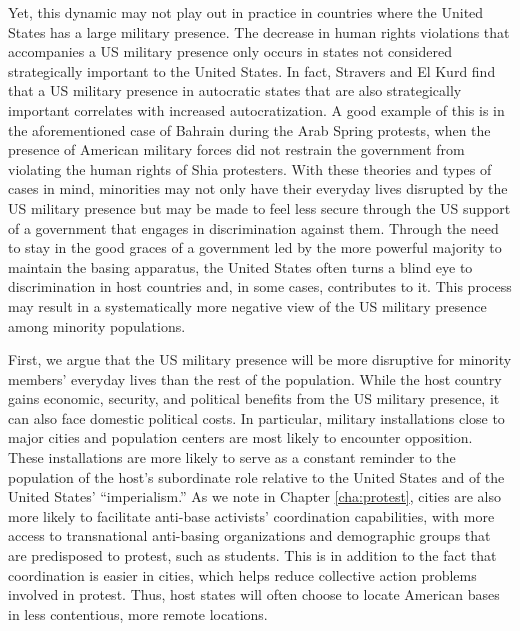 
Yet, this dynamic may not play out in practice in countries where the United States has a large military presence. The decrease in human rights violations that accompanies a US military presence only occurs in states not considered strategically important to the United States.\cite{bell2017} In fact, Stravers and El Kurd find that a US military presence in autocratic states that are also strategically important correlates with increased autocratization.\cite{StraversElKurd2018} A good example of this is in the aforementioned case of Bahrain during the Arab Spring protests, when the presence of American military forces did not restrain the government from violating the human rights of Shia protesters. With these theories and types of cases in mind, minorities may not only have their everyday lives disrupted by the US military presence but may be made to feel less secure through the US support of a government that engages in discrimination against them. Through the need to stay in the good graces of a government led by the more powerful majority to maintain the basing apparatus, the United States often turns a blind eye to discrimination in host countries and, in some cases, contributes to it. This process may result in a systematically more negative view of the US military presence among minority populations. 

First, we argue that the US military presence will be more disruptive for minority members' everyday lives than the rest of the population. While the host country gains economic, security, and political benefits from the US military presence, it can also face domestic political costs. In particular, military installations close to major cities and population centers are most likely to encounter opposition. These installations are more likely to serve as a constant reminder to the population of the host's subordinate role relative to the United States and of the United States' ``imperialism.''\cite{Cooley2008} As we note in Chapter \ref{cha:protest}, cities are also more likely to facilitate anti-base activists' coordination capabilities, with more access to transnational anti-basing organizations and demographic groups that are predisposed to protest, such as students. This is in addition to the fact that coordination is easier in cities, which helps reduce collective action problems involved in protest. Thus, host states will often choose to locate American bases in less contentious, more remote locations.\cite{Cooley2008}

